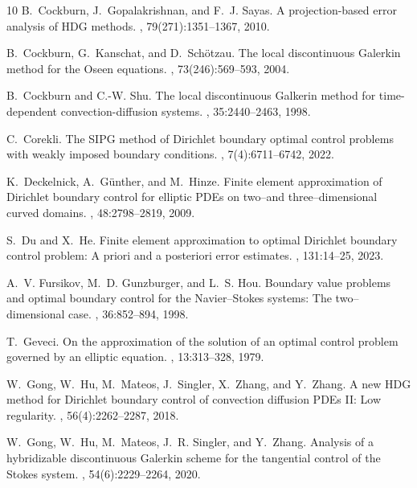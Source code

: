 \documentclass[a4paper,10pt]{article}
\numberwithin{theorem}{section}
\begin{document}
\begin{thebibliography}{10}
B.~Cockburn, J.~Gopalakrishnan, and F.~J. Sayas.
\newblock A projection-based error analysis of {HDG} methods.
, 79(271):1351--1367, 2010.

B.~Cockburn, G.~Kanschat, and D.~Sch{\"o}tzau.
\newblock The local discontinuous {G}alerkin method for the {O}seen equations.
, 73(246):569--593, 2004.

B.~Cockburn and C.-W. Shu.
\newblock The local discontinuous {G}alkerin method for time-dependent
  convection-diffusion systems.
, 35:2440--2463, 1998.

C.~Corekli.
\newblock The {SIPG} method of {Dirichlet} boundary optimal control problems
  with weakly imposed boundary conditions.
, 7(4):6711--6742, 2022.

K.~Deckelnick, A.~G\"unther, and M.~Hinze.
\newblock Finite element approximation of {D}irichlet boundary control for
  elliptic {PDEs} on two--and three--dimensional curved domains.
, 48:2798--2819, 2009.

S.~Du and X.~He.
\newblock Finite element approximation to optimal {D}irichlet boundary control
  problem: A priori and a posteriori error estimates.
, 131:14--25, 2023.

A.~V. Fursikov, M.~D. Gunzburger, and L.~S. Hou.
\newblock Boundary value problems and optimal boundary control for the
  {N}avier--{S}tokes systems: The two--dimensional case.
, 36:852--894, 1998.

T.~Geveci.
\newblock On the approximation of the solution of an optimal control problem
  governed by an elliptic equation.
, 13:313--328, 1979.

W.~Gong, W.~Hu, M.~Mateos, J.~Singler, X.~Zhang, and Y.~Zhang.
\newblock A new {HDG} method for {D}irichlet boundary control of convection
  diffusion {PDEs} {II}: Low regularity.
, 56(4):2262--2287, 2018.

W.~Gong, W.~Hu, M.~Mateos, J.~R. Singler, and Y.~Zhang.
\newblock Analysis of a hybridizable discontinuous {G}alerkin scheme for the
  tangential control of the {S}tokes system.
, 54(6):2229--2264, 2020.


\end{thebibliography}
\end{document}
